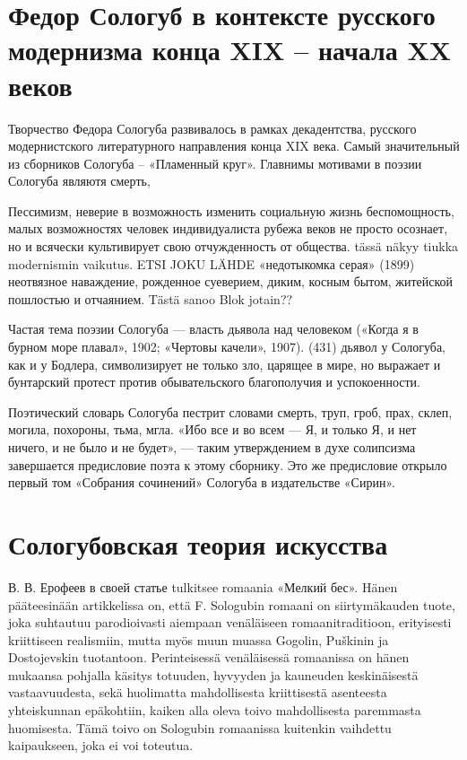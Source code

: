 \documentclass[12pt,a4paper]{article}
\begin{document}
\section{Федор Сологуб в контексте русского модернизма конца XIX -- начала XX веков}

Творчество Федора Сологуба развивалось в рамках декадентства, русского модернистского литературного направления конца XIX века.
Самый значительный из сборников Сологуба – «Пламенный круг».
Главнимы мотивами в поэзии Сологуба являютя смерть,  

Пессимизм, неверие в возможность изменить социальную жизнь
беспомощность, малых возможностях человек
индивидуалиста рубежа веков
 не просто осознает, но и всячески культивирует свою отчужденность от общества.
tässä näkyy tiukka modernismin vaikutus. ETSI JOKU LÄHDE
«недотыкомка серая» (1899)
неотвязное наваждение, рожденное суеверием, диким, косным бытом, житейской пошлостью и отчаянием.   Tästä sanoo Blok jotain??

Частая тема поэзии Сологуба — власть дьявола над человеком («Когда я в бурном море плавал», 1902; «Чертовы качели», 1907). (431)
дьявол у Сологуба, как и у Бодлера, символизирует не только зло, царящее в мире, но выражает и бунтарский протест против обывательского благополучия и успокоенности.

 Поэтический словарь Сологуба пестрит словами смерть, труп, гроб, прах, склеп, могила, похороны, тьма, мгла.
 «Ибо все и во всем — Я, и только Я, и нет ничего, и не было и не будет», — таким утверждением в духе солипсизма завершается предисловие поэта к этому сборнику. Это же предисловие открыло первый том «Собрания сочинений» Сологуба в издательстве «Сирин».

\section{Сологубовская теория искусства}

В. В. Ерофеев в своей статье  tulkitsee romaania «Мелкий бес». Hänen pääteesinään artikkelissa on, että F. Sologubin romaani on siirtymäkauden tuote, joka suhtautuu parodioivasti aiempaan venäläiseen romaanitraditioon, erityisesti kriittiseen realismiin, mutta myös muun muassa Gogolin, Puškinin ja Dostojevskin tuotantoon. Perinteisessä venäläisessä romaanissa on hänen mukaansa pohjalla käsitys totuuden, hyvyyden ja kauneuden keskinäisestä vastaavuudesta, sekä huolimatta mahdollisesta kriittisestä asenteesta yhteiskunnan epäkohtiin, kaiken alla oleva toivo mahdollisesta paremmasta huomisesta. Tämä toivo on Sologubin romaanissa kuitenkin vaihdettu kaipaukseen, joka ei voi toteutua. 
\end{document}
